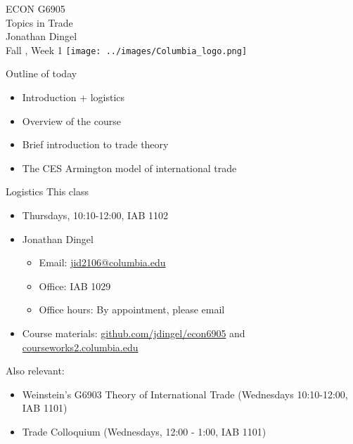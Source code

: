 \documentclass[10pt,notes=hide]{beamer}
\begin{document}
\begin{frame}[plain]
\begin{center}
\large
\textcolor{columbiadarkblue}{ECON G6905\\
Topics in Trade\\ 
Jonathan Dingel\\
Fall \the\year, Week 1}
\vfill 
\texttt{[image: ../images/Columbia\_logo.png]}
\end{center}
\end{frame}
\begin{frame}{Outline of today}
\begin{itemize}
	\item Introduction + logistics
	\item Overview of the course
	\item Brief introduction to trade theory
	\item The CES Armington model of international trade
\end{itemize}
\end{frame}
\begin{frame}{Logistics}
This class
\begin{itemize}
\item Thursdays, 10:10-12:00, IAB 1102
\item Jonathan Dingel
\begin{itemize}
	\item Email: \href{mailto:jid2106@columbia.edu}{jid2106@columbia.edu}
	\item Office: IAB 1029
	\item Office hours: By appointment, please email
\end{itemize}
\item Course materials:
\href{http://github.com/jdingel/econ6905}{github.com/jdingel/econ6905}
and \href{https://courseworks2.columbia.edu}{courseworks2.columbia.edu}
\end{itemize}
Also relevant:
\begin{itemize}
\item Weinstein's G6903 Theory of International Trade (Wednesdays 10:10-12:00, IAB 1101)\\
\item Trade Colloquium (Wednesdays, 12:00 - 1:00, IAB 1101)
\end{itemize}
\end{frame}
\end{document}
